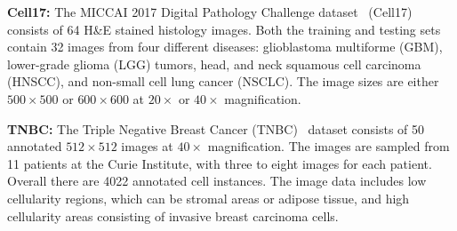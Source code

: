 \documentclass[letterpaper]{article} %
\begin{document}
\noindent \textbf{Cell17:}
The MICCAI 2017 Digital Pathology Challenge dataset~\cite{vu2019methods} (Cell17)  consists of 64 H\&E stained histology images. Both the training and testing sets contain 32 images from four different diseases: glioblastoma multiforme (GBM), lower-grade glioma (LGG) tumors, head, and neck squamous cell carcinoma (HNSCC), and non-small cell lung cancer (NSCLC). The image sizes are either $500 \times 500$ or $600 \times 600$ at $20\times$ or $40\times$ magnification.

\noindent \textbf{TNBC:}
The Triple Negative Breast Cancer (TNBC)~\cite{naylor2018segmentation} dataset consists of 50 annotated $512 \times 512$ images at $40\times$ magnification. The images are sampled from 11 patients at the Curie Institute, with three to eight images for each patient. Overall there are  4022 annotated cell instances. The image data includes low cellularity regions, which can be stromal areas or adipose tissue, and high cellularity areas consisting of invasive breast carcinoma cells.
\end{document}
